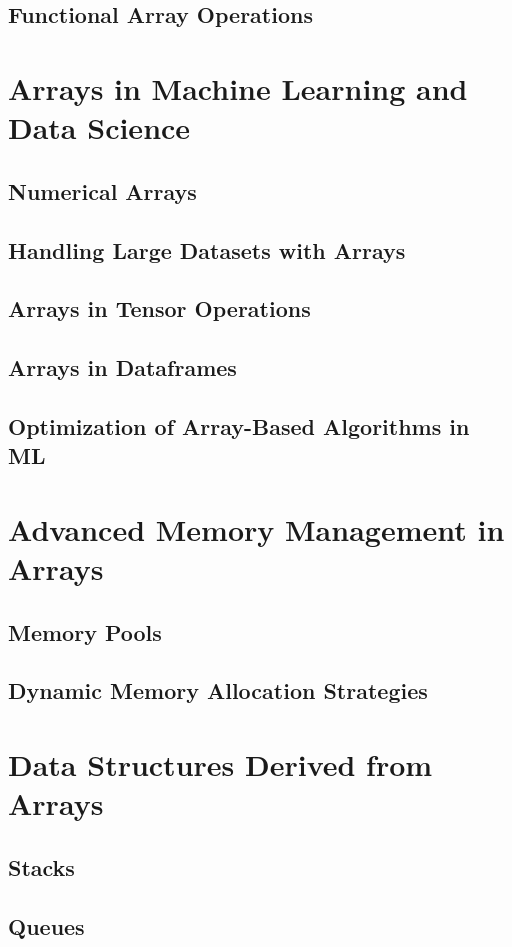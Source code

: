 \documentclass[12pt, oneside]{book}
\begin{document}
\section{Functional Array Operations}
	
\chapter{Arrays in Machine Learning and Data Science}
\section{Numerical Arrays}
\section{Handling Large Datasets with Arrays}
\section{Arrays in Tensor Operations}
\section{Arrays in Dataframes}
\section{Optimization of Array-Based Algorithms in ML}

\chapter{Advanced Memory Management in Arrays}
\section{Memory Pools}
\section{Dynamic Memory Allocation Strategies}

\chapter{Data Structures Derived from Arrays}
\section{Stacks}
\section{Queues}
\end{document}
